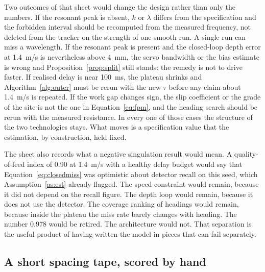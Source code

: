 Two outcomes of that sheet would change the design rather than only the numbers. If the resonant peak is absent, \(k\) or \(\lambda\) differs from the specification and the forbidden interval should be recomputed from the measured frequency, not deleted from the tracker on the strength of one smooth run. A single run can miss a wavelength. If the resonant peak is present and the closed-loop depth error at \SI{1.4}{m/s} is nevertheless above \SI{4}{mm}, the servo bandwidth or the bias estimate is wrong and Proposition~\ref{prop:split} still stands: the remedy is not to drive faster. If realised delay is near \SI{100}{ms}, the plateau shrinks and Algorithm~\ref{alg:outer} must be rerun with the new \(\tau\) before any claim about \SI{1.4}{m/s} is repeated. If the work gap changes sign, the slip coefficient or the grade of the site is not the one in Equation~\eqref{eq:fpm}, and the heading search should be rerun with the measured resistance. In every one of those cases the structure of the two technologies stays. What moves is a specification value that the estimation, by construction, held fixed.

The sheet also records what a negative singulation result would mean. A quality-of-feed index of \num{0.90} at \SI{1.4}{m/s} with a healthy delay budget would say that Equation~\eqref{eq:closedmiss} was optimistic about detector recall on this seed, which Assumption~\ref{as:est} already flagged. The speed constraint would remain, because it did not depend on the recall figure. The depth loop would remain, because it does not use the detector. The coverage ranking of headings would remain, because inside the plateau the miss rate barely changes with heading. The number \num{0.978} would be retired. The architecture would not. That separation is the useful product of having written the model in pieces that can fail separately.

\subsection{A short spacing tape, scored by hand}

